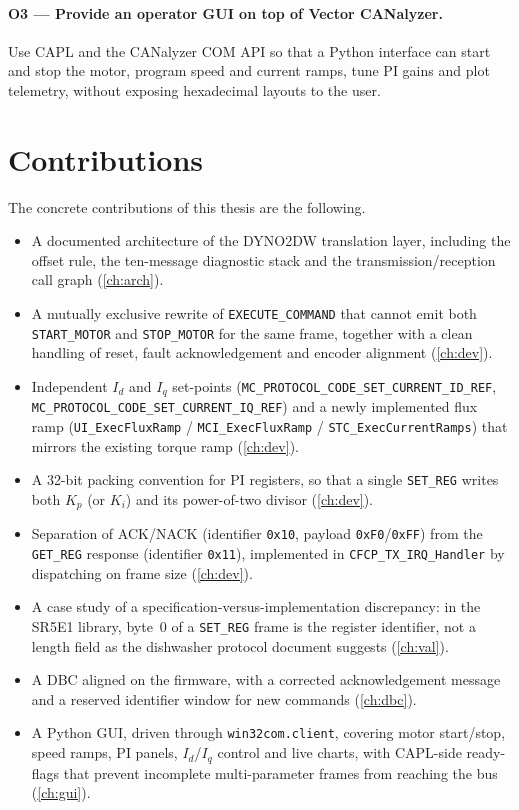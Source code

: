 \paragraph{O3 --- Provide an operator GUI on top of Vector CANalyzer.}
Use CAPL and the CANalyzer COM API so that a Python interface can start and
stop the motor, program speed and current ramps, tune PI gains and plot
telemetry, without exposing hexadecimal layouts to the user.

\section{Contributions}
The concrete contributions of this thesis are the following.

\begin{itemize}[leftmargin=1.6em]
  \item A documented architecture of the DYNO2DW translation layer, including
        the offset rule, the ten-message diagnostic stack and the
        transmission/reception call graph
        (\cref{ch:arch}).
  \item A mutually exclusive rewrite of \texttt{EXECUTE\_COMMAND} that
        cannot emit both \texttt{START\_MOTOR} and \texttt{STOP\_MOTOR} for
        the same frame, together with a clean handling of reset, fault
        acknowledgement and encoder alignment (\cref{ch:dev}).
  \item Independent $I_d$ and $I_q$ set-points
        (\texttt{MC\_PROTOCOL\_CODE\_SET\_CURRENT\_ID\_REF},
        \texttt{MC\_PROTOCOL\_CODE\_SET\_CURRENT\_IQ\_REF}) and a newly
        implemented flux ramp (\texttt{UI\_ExecFluxRamp} /
        \texttt{MCI\_ExecFluxRamp} / \texttt{STC\_ExecCurrentRamps}) that
        mirrors the existing torque ramp (\cref{ch:dev}).
  \item A 32-bit packing convention for PI registers, so that a single
        \texttt{SET\_REG} writes both $K_p$ (or $K_i$) and its
        power-of-two divisor (\cref{ch:dev}).
  \item Separation of ACK/NACK (identifier \texttt{0x10}, payload
        \texttt{0xF0}/\texttt{0xFF}) from the \texttt{GET\_REG} response
        (identifier \texttt{0x11}), implemented in
        \texttt{CFCP\_TX\_IRQ\_Handler} by dispatching on frame size
        (\cref{ch:dev}).
  \item A case study of a specification-versus-implementation discrepancy:
        in the SR5E1 library, byte~0 of a \texttt{SET\_REG} frame is the
        register identifier, not a length field as the dishwasher protocol
        document suggests (\cref{ch:val}).
  \item A DBC aligned on the firmware, with a corrected acknowledgement
        message and a reserved identifier window for new commands
        (\cref{ch:dbc}).
  \item A Python GUI, driven through \texttt{win32com.client}, covering
        motor start/stop, speed ramps, PI panels, $I_d$/$I_q$ control and
        live charts, with CAPL-side ready-flags that prevent incomplete
        multi-parameter frames from reaching the bus (\cref{ch:gui}).
\end{itemize}

